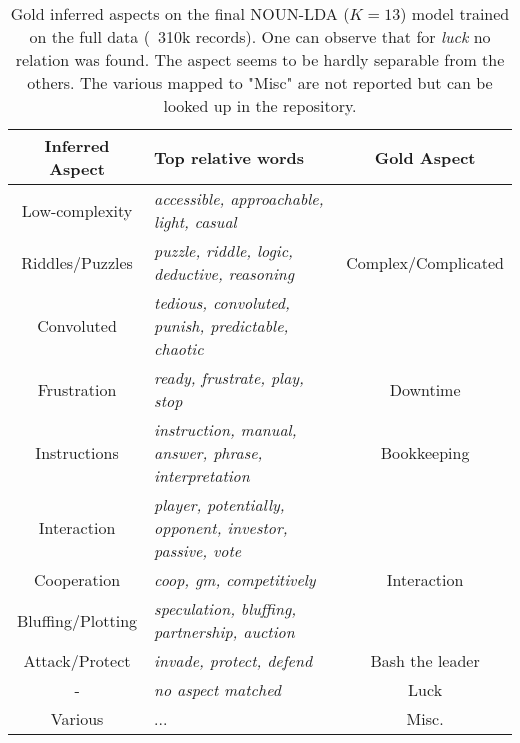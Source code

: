 \begin{center}

    \begin{table}
        \begin{tabular}{c l c}
            \hline
            Inferred Aspect   & Top relative words                                              & Gold Aspect \\ [0.5ex]
            \hline\hline
            Low-complexity    & \textit{accessible, approachable, light, casual}                &                     \\
            Riddles/Puzzles   & \textit{puzzle, riddle, logic, deductive, reasoning}            & Complex/Complicated \\
            Convoluted        & \textit{tedious, convoluted, punish, predictable, chaotic}      &                     \\
            \hline
            Frustration       & \textit{ready, frustrate, play, stop}                           & Downtime            \\
            \hline
            Instructions      & \textit{instruction, manual, answer, phrase, interpretation}    & Bookkeeping         \\
            \hline
            Interaction       & \textit{player, potentially, opponent, investor, passive, vote} &                     \\
            Cooperation       & \textit{coop, gm, competitively}                                & Interaction         \\
            Bluffing/Plotting & \textit{speculation, bluffing, partnership, auction}            &                     \\
            \hline
            Attack/Protect    & \textit{invade, protect, defend}                                & Bash the leader     \\
            \hline
            -                 & \textit{no aspect matched}                                      & Luck                \\
            \hline
            Various           & ...                                                             & Misc.               \\
            \hline
        \end{tabular}
        \caption{Gold inferred aspects on the final NOUN-LDA ($K =13$) model trained on the full data (~310k records).
        One can observe that for \textit{luck} no relation was found.
        The aspect seems to be hardly separable from the others.
        The various mapped to "Misc" are not reported but can be looked up in the repository.
        }
        \label{nounlda}

    \end{table}

\end{center}

